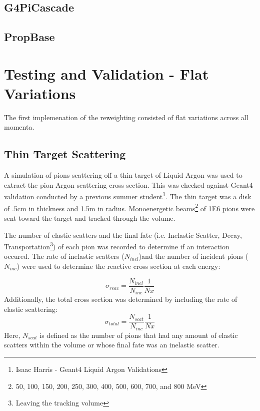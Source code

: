 \documentclass[12pt]{article}
\begin{document}
\subsection{G4PiCascade}

\subsection{PropBase}


\section{Testing and Validation - Flat Variations}
The first implemenation of the reweighting consisted of flat variations across all momenta.


\subsection{Thin Target Scattering}
A simulation of pions scattering off a thin target of Liquid Argon was used to extract the pion-Argon scattering cross section. %
This was checked against Geant4 validation conducted by a previous summer student\footnote{Isaac Harris - Geant4 Liquid Argon Validations}.
The thin target was a disk of .5cm in thickness and 1.5m in radius. Monoenergetic beams\footnote{{50, 100, 150, 200, 250, 300, 400, 500, 600, 700, and 800} MeV } of 1E6 pions were sent toward the target and tracked through the volume. 

The number of elastic scatters and the final fate (i.e. Inelastic Scatter, Decay, Transportation\footnote{Leaving the tracking volume}) of each pion was recorded to determine if an interaction occured. The rate of inelastic scatters ($N_{inel}$)and the number of incident pions ($N_{inc}$) were used to determine the reactive cross section at each energy: 

\begin{equation}\label{ref:reactive_xsec}
\sigma_{reac} = \frac{N_{inel}}{N_{inc}}\frac{1}{Nx}
\end{equation}
Additionally, the total cross section was determined by including the rate of elastic scattering:
\begin{equation}\label{ref:total_xsec}
\sigma_{total} = \frac{N_{scat}}{N_{inc}}\frac{1}{Nx}
\end{equation}
Here, $N_{scat}$ is defined as the number of pions that had any amount of elastic scatters within the volume or whose final fate was an inelastic scatter. 
\end{document}
